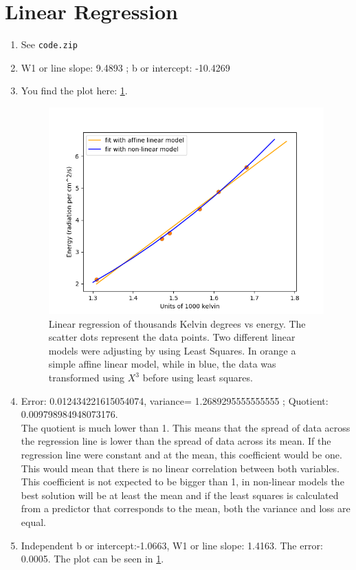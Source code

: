 \documentclass[a4paper]{article}
\begin{document}
\section{Linear Regression}

\begin{enumerate}
  \item See \texttt{code.zip}
  \item W1 or line slope:  9.4893 ;  b or intercept:  -10.4269 
  \item You find the plot here: \ref{fig:plot_regression}.
    \begin{figure}[H]
      \centering
      \includegraphics[width=\textwidth]{code/linear_regression}
      \caption{Linear regression of thousands Kelvin degrees vs energy. The scatter dots represent the data points. Two different linear models were adjusting by using Least Squares. In orange a simple affine linear model, while in blue, the data was transformed using $X^{3}$ before using least squares.}
      \label{fig:plot_regression}
    \end{figure}
  \item Error: 0.012434221615054074, variance= 1.2689295555555555 ; Quotient: 0.009798984948073176. \\ The quotient is much lower than 1. This means that the spread of data across the regression line is lower than the spread of data across its mean. If the regression line were constant and at the mean, this coefficient would be one. This would mean that there is no linear correlation between both variables. This coefficient is not expected to be bigger than 1, in non-linear models the best solution will be at least the mean and if the least squares is calculated from a predictor that corresponds to the mean, both the variance and loss are equal.
  
 \item Independent b or intercept:-1.0663,  W1 or line slope: 1.4163. The error: 0.0005. The plot can be seen in \ref{fig:plot_regression}.
\end{enumerate}
\end{document}
